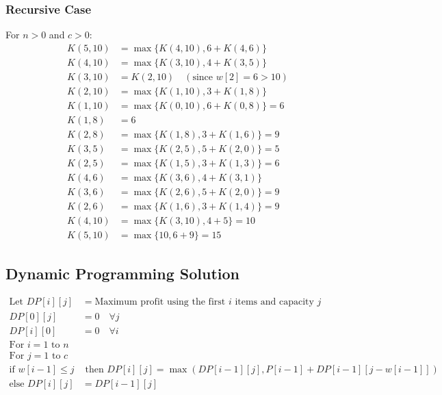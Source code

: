 \documentclass{article}
\begin{document}
\subsubsection*{Recursive Case}
For \( n > 0 \) and \( c > 0 \):
\begin{align*}
    K(5, 10) & = \max\{K(4, 10), 6 + K(4, 6)\}                \\
    K(4, 10) & = \max\{K(3, 10), 4 + K(3, 5)\}                \\
    K(3, 10) & = K(2, 10) \quad (\text{since } w[2] = 6 > 10) \\
    K(2, 10) & = \max\{K(1, 10), 3 + K(1, 8)\}                \\
    K(1, 10) & = \max\{K(0, 10), 6 + K(0, 8)\} = 6            \\
    K(1, 8)  & = 6                                            \\
    K(2, 8)  & = \max\{K(1, 8), 3 + K(1, 6)\} = 9             \\
    K(3, 5)  & = \max\{K(2, 5), 5 + K(2, 0)\} = 5             \\
    K(2, 5)  & = \max\{K(1, 5), 3 + K(1, 3)\} = 6             \\
    K(4, 6)  & = \max\{K(3, 6), 4 + K(3, 1)\}                 \\
    K(3, 6)  & = \max\{K(2, 6), 5 + K(2, 0)\} = 9             \\
    K(2, 6)  & = \max\{K(1, 6), 3 + K(1, 4)\} = 9             \\
    K(4, 10) & = \max\{K(3, 10), 4 + 5\} = 10                 \\
    K(5, 10) & = \max\{10, 6 + 9\} = 15
\end{align*}

\subsection*{Dynamic Programming Solution}
\begin{align*}
    \text{Let } DP[i][j]     & = \text{Maximum profit using the first } i \text{ items and capacity } j \\
    DP[0][j]                 & = 0 \quad \forall j                                                      \\
    DP[i][0]                 & = 0 \quad \forall i                                                      \\
    \text{For } i = 1 \text{ to } n                                                                     \\
    \text{For } j = 1 \text{ to } c                                                                     \\
    \text{if } w[i-1] \leq j & \text{ then } DP[i][j] = \max(DP[i-1][j], P[i-1] + DP[i-1][j-w[i-1]])    \\
    \text{else } DP[i][j]    & = DP[i-1][j]
\end{align*}
\end{document}
